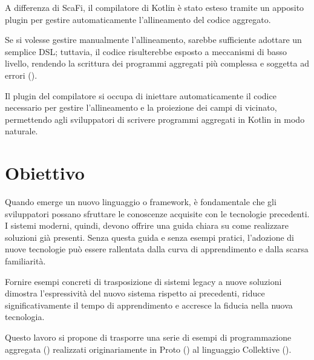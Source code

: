 A differenza di ScaFi, il compilatore di Kotlin è stato esteso tramite un apposito plugin per gestire automaticamente l'allineamento del codice aggregato.

Se si volesse gestire manualmente l'allineamento, sarebbe sufficiente adottare un semplice \ac{DSL}; tuttavia, il codice risulterebbe esposto a meccanismi di basso livello, rendendo la scrittura dei programmi aggregati più complessa e soggetta ad errori ().



Il plugin del compilatore si occupa di iniettare automaticamente il codice necessario per gestire l’allineamento e la proiezione dei campi di vicinato, permettendo agli sviluppatori di scrivere programmi aggregati in Kotlin in modo naturale.







\newpage
\section{Obiettivo}
\label{sec:obiettivo}

Quando emerge un nuovo linguaggio o framework, è fondamentale che gli sviluppatori possano sfruttare le conoscenze acquisite con le tecnologie precedenti. I sistemi moderni, quindi, devono offrire una guida chiara su come realizzare soluzioni già presenti. Senza questa guida e senza esempi pratici, l'adozione di nuove tecnologie può essere rallentata dalla curva di apprendimento e dalla scarsa familiarità.

Fornire esempi concreti di trasposizione di sistemi legacy a nuove soluzioni dimostra l'espressività del nuovo sistema rispetto ai precedenti, riduce significativamente il tempo di apprendimento e accresce la fiducia nella nuova tecnologia.

Questo lavoro si propone di trasporre una serie di esempi di programmazione aggregata () realizzati originariamente in Proto () al linguaggio Collektive ().
